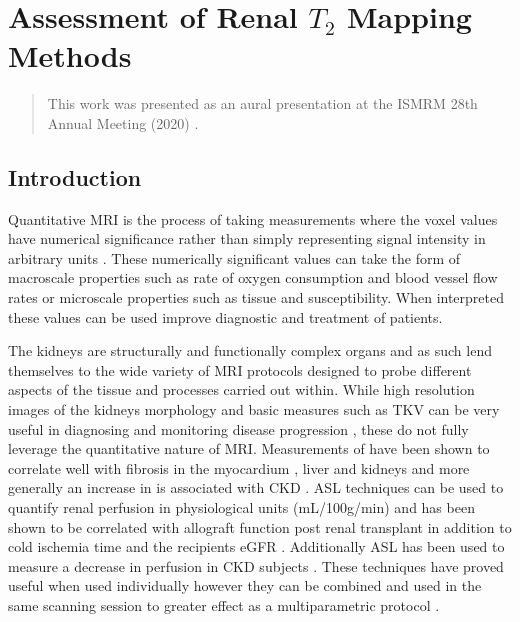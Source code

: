 \chapter{Assessment of Renal $T_2$ Mapping Methods}
\label{chap:t2_mapping}

\begin{abstract}
	This work was presented as an aural presentation at the \ac{ISMRM} 28th Annual Meeting (2020) \cite{daniel_comparison_2020}.
	
	\lipsum[1]
\end{abstract}
\newpage
\acresetall

\section{Introduction}
\label{sec:t2_intro}
Quantitative \ac{MRI} is the process of taking measurements where the voxel values have numerical significance rather than simply representing signal intensity in arbitrary units \cite{tofts_quantitative_2003}. These numerically significant values can take the form of macroscale properties such as rate of oxygen consumption and blood vessel flow rates or microscale properties such as tissue \tone and susceptibility. When interpreted these values can be used improve diagnostic and treatment of patients.

The kidneys are structurally and functionally complex organs and as such lend themselves to the wide variety of MRI protocols designed to probe different aspects of the tissue and processes carried out within. While high resolution images of the kidneys morphology and basic measures such as \ac{TKV} can be very useful in diagnosing and monitoring disease progression \cite{buchanan_quantitative_2019, chapman_kidney_2012, gong_relationship_2012}, these do not fully leverage the quantitative nature of \ac{MRI}. Measurements of \tone have been shown to correlate well with fibrosis in the myocardium \cite{bull_human_2013, ferreira_t1_2013}, liver \cite{hoad_study_2015, luetkens_quantification_2018} and kidneys \cite{friedli_new_2016} and more generally an increase in \tone is associated with \ac{CKD} \cite{gillis_non-contrast_2016, cox_multiparametric_2017, buchanan_quantitative_2019}. \ac{ASL} techniques can be used to quantify renal perfusion in physiological units (mL/100g/min) and has been shown to be correlated with allograft function post renal transplant in addition to cold ischemia time and the recipients \ac{eGFR} \cite{hueper_functional_2015, artz_arterial_2011, ren_evaluation_2016, niles_longitudinal_2016}. Additionally \ac{ASL} has been used to measure a decrease in perfusion in \ac{CKD} subjects \cite{gillis_non-contrast_2016, rossi_histogram_2012, tan_renal_2014}. These techniques have proved useful when used individually however they can be combined and used in the same scanning session to greater effect as a multiparametric protocol \cite{buchanan_quantitative_2019, cox_multiparametric_2017, eckerbom_multiparametric_2019, schley_multiparametric_2018, hueper_kidney_2016}.

